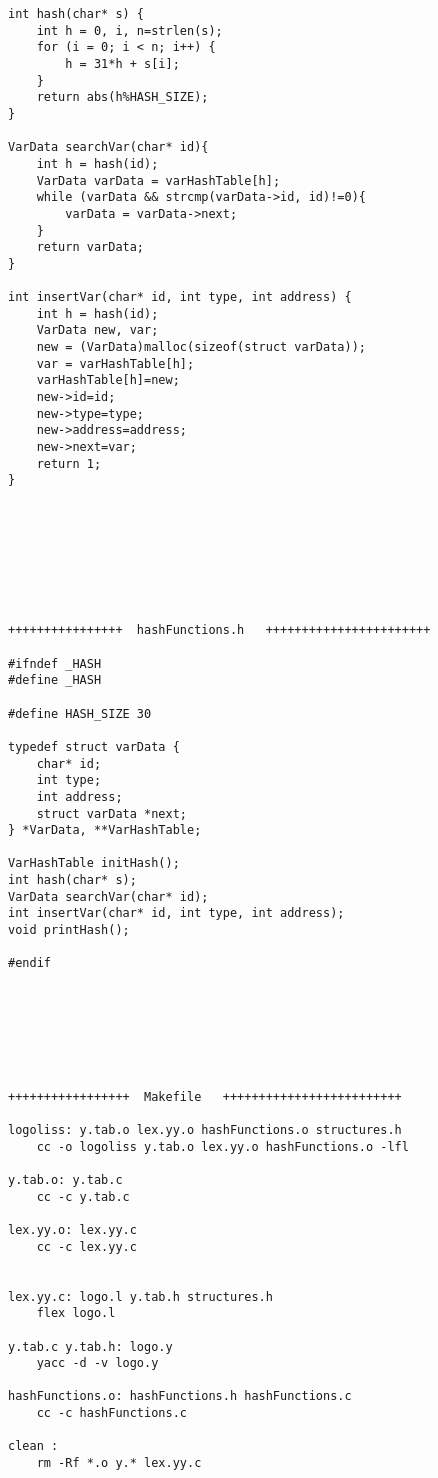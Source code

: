 \documentclass[12pt,a4paper,oneside]{article}
\newenvironment{codefold}{}{}
\begin{document}
\begin{codefold}
\begin{verbatim}
int hash(char* s) {
	int h = 0, i, n=strlen(s);
	for (i = 0; i < n; i++) {
		h = 31*h + s[i];
	}
	return abs(h%HASH_SIZE);
}

VarData searchVar(char* id){
	int h = hash(id);
	VarData varData = varHashTable[h];
	while (varData && strcmp(varData->id, id)!=0){
		varData = varData->next;
	}
	return varData;
}

int insertVar(char* id, int type, int address) {
	int h = hash(id);
	VarData new, var;
	new = (VarData)malloc(sizeof(struct varData));
	var = varHashTable[h];
	varHashTable[h]=new;
	new->id=id;
	new->type=type;
	new->address=address;
	new->next=var;
	return 1;
}








++++++++++++++++  hashFunctions.h   +++++++++++++++++++++++

#ifndef _HASH
#define _HASH

#define HASH_SIZE 30

typedef struct varData {
	char* id;
	int type;
	int address;
	struct varData *next;
} *VarData, **VarHashTable;

VarHashTable initHash();
int hash(char* s);
VarData searchVar(char* id);
int insertVar(char* id, int type, int address);
void printHash();

#endif







+++++++++++++++++  Makefile   +++++++++++++++++++++++++

logoliss: y.tab.o lex.yy.o hashFunctions.o structures.h
	cc -o logoliss y.tab.o lex.yy.o hashFunctions.o -lfl

y.tab.o: y.tab.c
	cc -c y.tab.c

lex.yy.o: lex.yy.c
	cc -c lex.yy.c


lex.yy.c: logo.l y.tab.h structures.h
	flex logo.l

y.tab.c y.tab.h: logo.y
	yacc -d -v logo.y

hashFunctions.o: hashFunctions.h hashFunctions.c
	cc -c hashFunctions.c

clean : 
	rm -Rf *.o y.* lex.yy.c
\end{verbatim}

\end{codefold}
\end{document}
